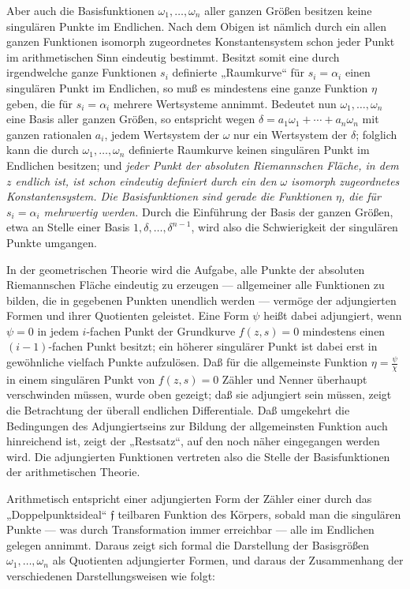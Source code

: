 \documentclass[11pt]{article}
\providecommand{\frf}{\mathfrak f}
\begin{document}
Aber auch die Basisfunktionen \(\omega_1,\ldots,\omega_n\) aller ganzen Größen besitzen keine singulären Punkte im Endlichen. Nach dem Obigen ist nämlich durch ein allen ganzen Funktionen isomorph zugeordnetes Konstantensystem schon jeder Punkt im arithmetischen Sinn eindeutig bestimmt. Besitzt somit eine durch irgendwelche ganze Funktionen \(s_i\) definierte „Raumkurve“ für \(s_i=\alpha_i\) einen singulären Punkt im Endlichen, so muß es mindestens eine ganze Funktion \(\eta\) geben, die für \(s_i=\alpha_i\) mehrere Wertsysteme annimmt. Bedeutet nun \(\omega_1,\ldots,\omega_n\) eine Basis aller ganzen Größen, so entspricht wegen \(\delta=a_1\omega_1+\cdots+a_n\omega_n\) mit ganzen rationalen \(a_i\), jedem Wertsystem der \(\omega\) nur ein Wertsystem der \(\delta\); folglich kann die durch \(\omega_1,\ldots,\omega_n\) definierte Raumkurve keinen singulären Punkt im Endlichen besitzen; und \emph{jeder Punkt der absoluten Riemannschen Fläche, in dem \(z\) endlich ist, ist schon eindeutig definiert durch ein den \(\omega\) isomorph zugeordnetes Konstantensystem. Die Basisfunktionen sind gerade die Funktionen \(\eta\), die für \(s_i=\alpha_i\) mehrwertig werden.} Durch die Einführung der Basis der ganzen Größen, etwa an Stelle einer Basis \(1,\delta,\ldots,\delta^{n-1}\), wird also die Schwierigkeit der singulären Punkte umgangen.

In der geometrischen Theorie wird die Aufgabe, alle Punkte der absoluten Riemannschen Fläche eindeutig zu erzeugen --- allgemeiner alle Funktionen zu bilden, die in gegebenen Punkten unendlich werden --- vermöge der adjungierten Formen und ihrer Quotienten geleistet. Eine Form \(\psi\) heißt dabei adjungiert, wenn \(\psi=0\) in jedem \(i\)-fachen Punkt der Grundkurve \(f(z,s)=0\) mindestens einen \((i-1)\)-fachen Punkt besitzt; ein höherer singulärer Punkt ist dabei erst in gewöhnliche vielfach Punkte aufzulösen. Daß für die allgemeinste Funktion \(\eta=\frac{\psi}{\chi}\) in einem singulären Punkt von \(f(z,s)=0\) Zähler und Nenner überhaupt verschwinden müssen, wurde oben gezeigt; daß sie adjungiert sein müssen, zeigt die Betrachtung der überall endlichen Differentiale. Daß umgekehrt die Bedingungen des Adjungiertseins zur Bildung der allgemeinsten Funktion auch hinreichend ist, zeigt der „Restsatz“, auf den noch näher eingegangen werden wird. Die adjungierten Funktionen vertreten also die Stelle der Basisfunktionen der arithmetischen Theorie.

Arithmetisch entspricht einer adjungierten Form der Zähler einer durch das „Doppelpunktsideal“ \(\frf\) teilbaren Funktion des Körpers, sobald man die singulären Punkte --- was durch Transformation immer erreichbar --- alle im Endlichen gelegen annimmt. Daraus zeigt sich formal die Darstellung der Basisgrößen \(\omega_1,\ldots,\omega_n\) als Quotienten adjungierter Formen, und daraus der Zusammenhang der verschiedenen Darstellungsweisen wie folgt:
\end{document}
